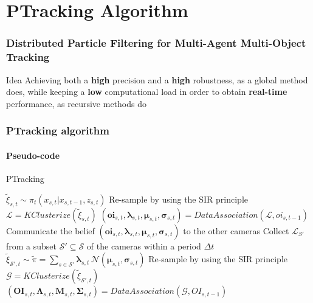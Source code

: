 \section{PTracking Algorithm}

\begin{frame}
	\frametitle{Distributed Particle Filtering for Multi-Agent Multi-Object Tracking}
	
	\Large
	
	\begin{block}{Idea}
		Achieving both a \textbf{high} precision and a \textbf{high} robustness, as a
		global method does, while keeping a \textbf{low} computational load in order to
		obtain \textbf{real-time} performance, as recursive methods do
	\end{block}
\end{frame}

\begin{frame}
	\frametitle{PTracking algorithm}
	\framesubtitle{Pseudo-code}
	
	\begin{algorithm}[H]
		\tiny
		\caption{PTracking}
		\BlankLine
		\BlankLine
		\BlankLine
		\Begin
		{
			$ \tilde{\xi}_{s,t} \sim \pi_t (x_{s,t} | x_{s,t-1},z_{s,t}) $
			\BlankLine
			Re-sample by using the SIR principle\\
			\BlankLine
			$ \mathcal{L} = KClusterize(\tilde{\xi}_{s,t}) $
			\BlankLine
			$ (\boldsymbol{oi}_{s,t},\boldsymbol\lambda_{s,t},\boldsymbol\mu_{s,t},\boldsymbol\sigma_{s,t}) = DataAssociation(\mathcal{L}, oi_{s,t-1}) $
			\BlankLine
			Communicate the belief $ (\boldsymbol{oi}_{s,t},\boldsymbol\lambda_{s,t},\boldsymbol\mu_{s,t},\boldsymbol\sigma_{s,t}) $ to the other cameras
		}
		\BlankLine
		\Begin
		{
			Collect $ \mathcal{L}_{S'} $ from a subset $ \mathcal{S'} \subseteq \mathcal{S} $ of the cameras within a period $ \Delta t $
			\BlankLine
			$ \tilde{\xi}_{\mathcal{S'},t} \sim \tilde\pi = \sum_{s \in \mathcal{S'}} \boldsymbol\lambda_{s,t} \, \mathcal{N} (\boldsymbol\mu_{s,t},\boldsymbol\sigma_{s,t}) $
			\BlankLine
			Re-sample by using the SIR principle\\
			\BlankLine
			$ \mathcal{G} = KClusterize(\tilde\xi_{{\mathcal{S'},t}}) $
			\BlankLine
			$ (\boldsymbol{OI}_{s,t},\boldsymbol\Lambda_{s,t},\boldsymbol{M}_{s,t},\boldsymbol\Sigma_{s,t}) = DataAssociation(\mathcal{G},OI_{s,t-1}) $
		}
	\end{algorithm}
\end{frame}

